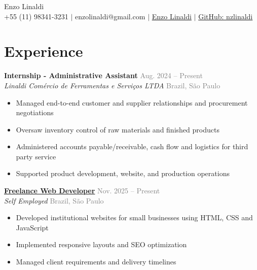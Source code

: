 \documentclass[a4paper, 12pt]{article}
\newcommand{\resumeSubSection}[4]{%
\vspace{-1pt}\noindent
\textbf{#1} \hfill \textcolor{gray}{#2}\\
\textit{#3} \hfill \textcolor{gray}{#4}
}
\newcommand{\resumeItemsSubSection}[1]{%
\vspace{-8pt}\small \begin{itemize}\setlength{\itemsep}{-0.3em}
#1
\end{itemize}
}
\begin{document}
\pagestyle{empty}

\begin{center}
    {\Huge Enzo Linaldi} \\ \vspace{5pt}
    \small \faPhone* +55 (11) 98341-3231 \hspace{1pt} $|$
    \hspace{1pt} \faEnvelope \hspace{2pt} enzolinaldi@gmail.com \hspace{1pt} $|$ 
    \hspace{1pt} \faLinkedin \hspace{2pt} \href{https://www.linkedin.com/in/enzo-linaldi-315204389/}{Enzo Linaldi} \hspace{1pt} $|$
    \hspace{1pt} \faGithub \hspace{2pt} \href{https://github.com/nzlinaldi}{GitHub: nzlinaldi}
    \\ \vspace{-3pt}
\end{center}

\section{Experience}
\resumeSubSection
{Internship - Administrative Assistant}
{Aug. 2024 -- Present}
{Linaldi Comércio de Ferramentas e Serviços LTDA}{Brazil, São Paulo}

\resumeItemsSubSection{
\item Managed end-to-end customer and supplier relationships and procurement negotiations
\item Oversaw inventory control of raw materials and finished products
\item Administered accounts payable/receivable, cash flow and logistics for third party service
\item Supported product development, website, and production operations
}

\resumeSubSection {\href{https://vinyacademy.com.br}{Freelance Web Developer}}{Nov. 2025 -- Present}{Self Employed}{Brazil, São Paulo}

\resumeItemsSubSection{
\item Developed institutional websites for small businesses using HTML, CSS and JavaScript
\item Implemented responsive layouts and SEO optimization
\item Managed client requirements and delivery timelines
}
\end{document}
